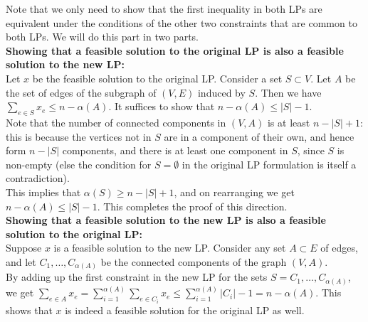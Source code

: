 \documentclass[a4paper]{article}
\newcommand{\nl}{\vspace{0.2cm}\\}
\begin{document}
Note that we only need to show that the first inequality in both LPs are equivalent under the conditions of the other two constraints that are common to both LPs. We will do this part in two parts.\nl
\textbf{Showing that a feasible solution to the original LP is also a feasible solution to the new LP:}\nl
Let $x$ be the feasible solution to the original LP. Consider a set $S \subset V$. Let $A$ be the set of edges of the subgraph of $(V, E)$ induced by $S$. Then we have $\sum_{e \in S} x_e \le n -
\alpha(A)$. It suffices to show that $n - \alpha(A) \le |S| - 1$.\nl
Note that the number of connected components in $(V, A)$ is at least $n - |S| + 1$: this is because the vertices not in $S$ are
in a component of their own, and hence form $n - |S|$ components, and there is at least one component in $S$, since $S$ is non-empty (else the condition for $S = \emptyset$ in the original
LP formulation is itself a contradiction).\nl
This implies that $\alpha(S) \ge n - |S| + 1$, and on rearranging we get $n - \alpha(A) \le |S| - 1$. This completes the proof of this direction.\nl
\textbf{Showing that a feasible solution to the new LP is also a feasible solution to the original LP:}\nl
Suppose $x$ is a feasible solution to the new LP. Consider any set $A \subset E$ of edges, and let $C_1, \ldots, C_{\alpha(A)}$ be the connected components of the graph $(V, A)$.\nl
By adding up the first constraint in the new LP for the sets $S = C_1, \ldots, C_{\alpha(A)}$, we get $\sum_{e \in A} x_e = \sum_{i = 1}^{\alpha(A)} \sum_{e \in C_i} x_e \le \sum_{i =
1}^{\alpha(A)} |C_i| - 1 = n - \alpha(A)$. This shows that $x$ is indeed a feasible solution for the original LP as well.
\end{document}
